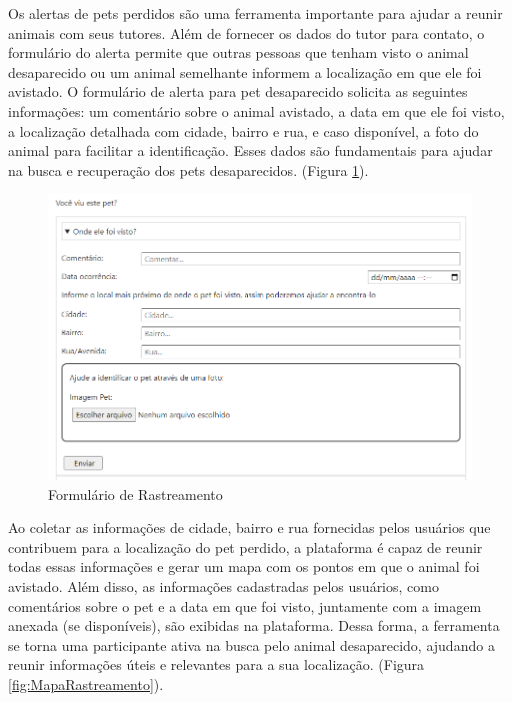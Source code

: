 Os alertas de pets perdidos são uma ferramenta importante para ajudar a reunir animais com seus tutores. Além de fornecer os dados do tutor para contato, o formulário do alerta permite que outras pessoas que tenham visto o animal desaparecido ou um animal semelhante informem a localização em que ele foi avistado. O formulário de alerta para pet desaparecido solicita as seguintes informações: um comentário sobre o animal avistado, a data em que ele foi visto, a localização detalhada com cidade, bairro e rua, e caso disponível, a foto do animal para facilitar a identificação. Esses dados são fundamentais para ajudar na busca e recuperação dos pets desaparecidos. 
(Figura \ref{fig:FormularioRastreamento}).
\begin{figure}[htb]
     \centering
     \includegraphics[width=14cm]{arquivos/Figuras/image3.png}
     \caption{Formulário de Rastreamento}
         \label{fig:FormularioRastreamento}
\end{figure}

\newpage
Ao coletar as informações de cidade, bairro e rua fornecidas pelos usuários que contribuem para a localização do pet perdido, a plataforma é capaz de reunir todas essas informações e gerar um mapa com os pontos em que o animal foi avistado. Além disso, as informações cadastradas pelos usuários, como comentários sobre o pet e a data em que foi visto, juntamente com a imagem anexada (se disponíveis), são exibidas na plataforma. Dessa forma, a ferramenta se torna uma participante ativa na busca pelo animal desaparecido, ajudando a reunir informações úteis e relevantes para a sua localização. (Figura \ref{fig:MapaRastreamento}).


